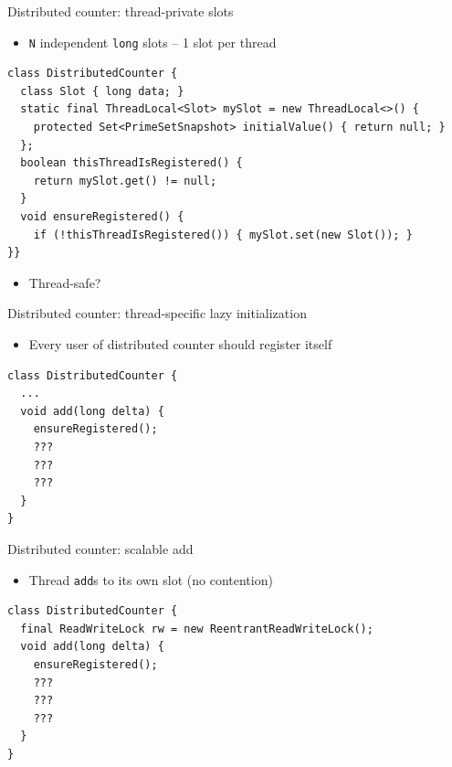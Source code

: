 \begin{frame}{Distributed counter: thread-private slots}

\begin{itemize}
    \item \texttt{N} independent \texttt{long} slots -- 1 slot per thread    
\end{itemize}

\begin{verbatim}
class DistributedCounter {
  class Slot { long data; }
  static final ThreadLocal<Slot> mySlot = new ThreadLocal<>() {
    protected Set<PrimeSetSnapshot> initialValue() { return null; }
  };
  boolean thisThreadIsRegistered() { 
    return mySlot.get() != null; 
  }
  void ensureRegistered() {
    if (!thisThreadIsRegistered()) { mySlot.set(new Slot()); }
}}
\end{verbatim}

\pause

\begin{itemize}
    \item Thread-safe?
\end{itemize}

\end{frame}


\begin{frame}{Distributed counter: thread-specific lazy initialization}

\begin{itemize}
    \item Every user of distributed counter should register itself
\end{itemize}

\begin{verbatim}
class DistributedCounter {
  ...
  void add(long delta) {
    ensureRegistered();
    ???
    ???
    ???
  }
}
\end{verbatim}
\end{frame}


\begin{frame}{Distributed counter: scalable add}

\begin{itemize}
    \item Thread \texttt{add}s to its own slot (no contention)    
\end{itemize}

\begin{verbatim}
class DistributedCounter {
  final ReadWriteLock rw = new ReentrantReadWriteLock();
  void add(long delta) {
    ensureRegistered();
    ???
    ???
    ???
  }
}
\end{verbatim}
\end{frame}

